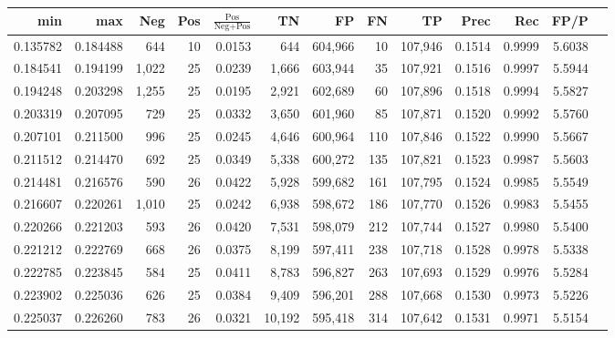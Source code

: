 \begin{tabular}{rrrrrrrrrrrrr}
\toprule
     min &      max &   Neg & Pos & $\frac{\text{Pos}}{\text{Neg}+\text{Pos}}$ &      TN &      FP &      FN &      TP &   Prec &    Rec &   FP/P \\
\midrule
0.135782 & 0.184488 &   644 &  10 &                                     0.0153 &     644 & 604,966 &      10 & 107,946 & 0.1514 & 0.9999 & 5.6038 \\
0.184541 & 0.194199 & 1,022 &  25 &                                     0.0239 &   1,666 & 603,944 &      35 & 107,921 & 0.1516 & 0.9997 & 5.5944 \\
0.194248 & 0.203298 & 1,255 &  25 &                                     0.0195 &   2,921 & 602,689 &      60 & 107,896 & 0.1518 & 0.9994 & 5.5827 \\
0.203319 & 0.207095 &   729 &  25 &                                     0.0332 &   3,650 & 601,960 &      85 & 107,871 & 0.1520 & 0.9992 & 5.5760 \\
0.207101 & 0.211500 &   996 &  25 &                                     0.0245 &   4,646 & 600,964 &     110 & 107,846 & 0.1522 & 0.9990 & 5.5667 \\
0.211512 & 0.214470 &   692 &  25 &                                     0.0349 &   5,338 & 600,272 &     135 & 107,821 & 0.1523 & 0.9987 & 5.5603 \\
0.214481 & 0.216576 &   590 &  26 &                                     0.0422 &   5,928 & 599,682 &     161 & 107,795 & 0.1524 & 0.9985 & 5.5549 \\
0.216607 & 0.220261 & 1,010 &  25 &                                     0.0242 &   6,938 & 598,672 &     186 & 107,770 & 0.1526 & 0.9983 & 5.5455 \\
0.220266 & 0.221203 &   593 &  26 &                                     0.0420 &   7,531 & 598,079 &     212 & 107,744 & 0.1527 & 0.9980 & 5.5400 \\
0.221212 & 0.222769 &   668 &  26 &                                     0.0375 &   8,199 & 597,411 &     238 & 107,718 & 0.1528 & 0.9978 & 5.5338 \\
0.222785 & 0.223845 &   584 &  25 &                                     0.0411 &   8,783 & 596,827 &     263 & 107,693 & 0.1529 & 0.9976 & 5.5284 \\
0.223902 & 0.225036 &   626 &  25 &                                     0.0384 &   9,409 & 596,201 &     288 & 107,668 & 0.1530 & 0.9973 & 5.5226 \\
0.225037 & 0.226260 &   783 &  26 &                                     0.0321 &  10,192 & 595,418 &     314 & 107,642 & 0.1531 & 0.9971 & 5.5154 \\

\end{tabular}

